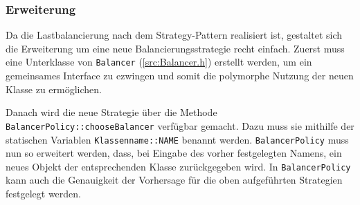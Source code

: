 \subsubsection{Erweiterung}\label{lastbalancierung_erweiterung}

Da die Lastbalancierung nach dem Strategy-Pattern realisiert ist, gestaltet sich die Erweiterung um eine neue Balancierungsstrategie recht einfach.
Zuerst muss eine Unterklasse von \verb|Balancer| (\autoref{src:Balancer.h}) erstellt werden, um ein gemeinsames Interface zu ezwingen und somit die polymorphe Nutzung der neuen Klasse zu ermöglichen.

\begin{figure}[h!]
	
\end{figure}

Danach wird die neue Strategie über die Methode \verb|BalancerPolicy::chooseBalancer| verfügbar gemacht.
Dazu muss sie mithilfe der statischen Variablen \verb|Klassenname::NAME| benannt werden.
\verb|BalancerPolicy| muss nun so erweitert werden, dass, bei Eingabe des vorher festgelegten Namens, ein neues Objekt der entsprechenden Klasse zurückgegeben wird.
In \verb|BalancerPolicy| kann auch die Genauigkeit der Vorhersage für die oben aufgeführten Strategien festgelegt werden.


